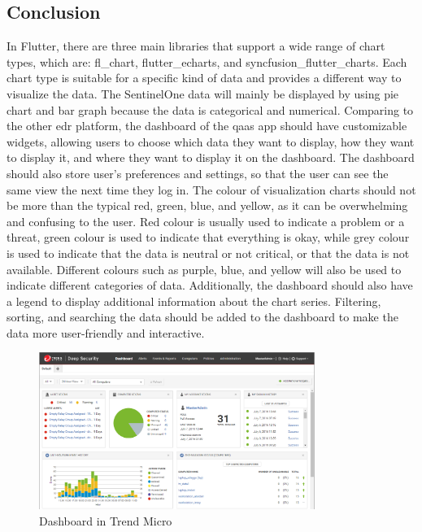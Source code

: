 \begin{multicols}{2}
      \subsection{Conclusion}
      In Flutter, there are three main libraries that support a wide range of chart types, which are: fl\_chart,
      flutter\_echarts, and syncfusion\_flutter\_charts. Each chart type is suitable for a specific kind of data
      and provides a different way to visualize the data. The SentinelOne data will mainly be displayed by using
      pie chart and bar graph because the data is categorical and numerical. Comparing to the other \acrshort{edr}
      platform, the dashboard of the \acrshort{qaas} app should have customizable widgets, allowing users to
      choose which data they want to display, how they want to display it, and where they want to display it on
      the dashboard. The dashboard should also store user's preferences and settings, so that the user can see
      the same view the next time they log in. The colour of visualization charts should not be more than the
      typical red, green, blue, and yellow, as it can be overwhelming and confusing to the user. Red colour is
      usually used to indicate a problem or a threat,  green colour is used to indicate that everything is okay,
      while grey colour is used to indicate that the data is neutral or not critical, or that the data is not
      available. Different colours such as purple, blue, and yellow will also be used to indicate different
      categories of data. Additionally, the dashboard should also have a legend to display additional information
      about the chart series. Filtering, sorting, and searching the data should be added to the dashboard to make
      the data more user-friendly and interactive.
\end{multicols}

\begin{figure}[htbp]
      \centering
      \includegraphics[width=0.8\textwidth]{Figures/Trend Micro/dashboard-1.png}
      \caption{Dashboard in Trend Micro}
\end{figure}

